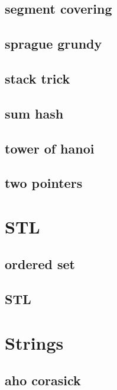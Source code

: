 \subsection{segment covering}
\raggedbottom
\hrulefill
\subsection{sprague grundy}
\raggedbottom
\hrulefill
\subsection{stack trick}
\raggedbottom
\hrulefill
\subsection{sum hash}
\raggedbottom
\hrulefill
\subsection{tower of hanoi}
\raggedbottom
\hrulefill
\subsection{two pointers}
\raggedbottom
\hrulefill

\section{STL}
\subsection{ordered set}
\raggedbottom
\hrulefill
\subsection{STL}
\raggedbottom
\hrulefill

\section{Strings}
\subsection{aho corasick}
\raggedbottom
\hrulefill

